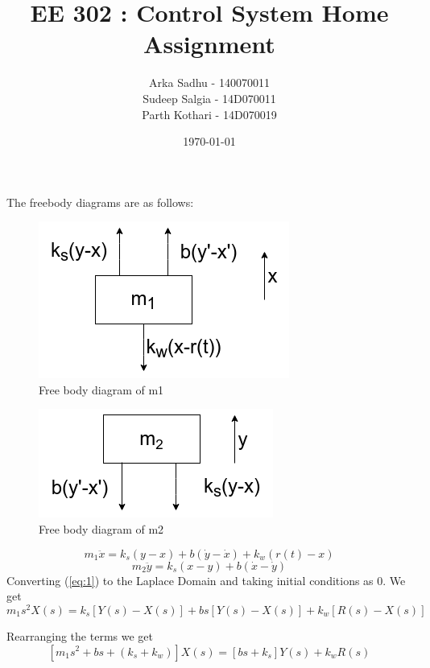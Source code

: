 \documentclass{article}
\title{EE 302 : Control System Home Assignment}
\author{
  Arka Sadhu - 140070011\\
  Sudeep Salgia - 14D070011\\
  Parth Kothari - 14D070019\\
}
\date{\today}
\newenvironment{answer}[2][Answer]{\begin{trivlist}
  \item[\hskip \labelsep {\bfseries #1}\hskip \labelsep {\bfseries #2:}]}{\end{trivlist}}
\begin{document}
\maketitle
\begin{answer} a
  The freebody diagrams are as follows:
  \begin{figure}[H]
    \centering
    \includegraphics[scale=0.5]{images/m1_fbd}
    \caption{Free body diagram of m1}
    \label{fig:1}
  \end{figure}
  \begin{figure}[H]
    \centering
    \includegraphics[scale=0.5]{images/m2_fbd}
    \caption{Free body diagram of m2}
    \label{fig:2}
  \end{figure}
  \begin{equation}
    \label{eq:1}
    m_1\ddot{x} = k_s(y-x) + b(\dot{y} - \dot{x}) + k_w(r(t) - x)
  \end{equation}
  \begin{equation}
    \label{eq:2}
    m_2\ddot{y} = k_s(x-y) + b(\dot{x} - \dot{y}) 
  \end{equation}
  Converting (\ref{eq:1}) to the Laplace Domain and taking initial conditions as 0. We get
  \begin{equation}
    \label{eq:3}
    m_1s^2X(s) = k_s[Y(s) - X(s)] + bs[Y(s) - X(s)] + k_w[R(s) - X(s)]
  \end{equation}
  
  Rearranging the terms we get
  \begin{equation}
    \label{eq:4}
    [m_1 s^2 + bs + (k_s+k_w)]X(s) = [bs + k_s]Y(s) + k_wR(s)
  \end{equation}


\end{answer}
\end{document}
